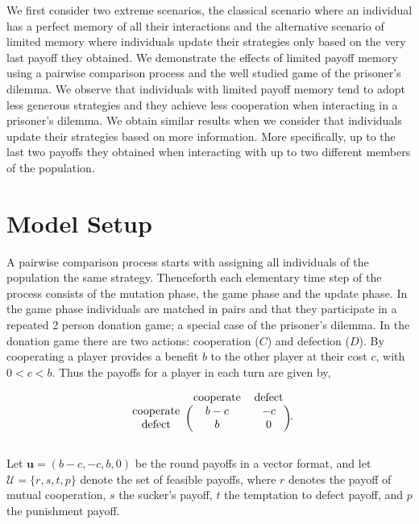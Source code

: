 \documentclass[11pt]{article}
\theoremstyle{plainCl1}
\theoremstyle{plainCl2}
\begin{document}
We first consider two extreme scenarios, the classical scenario where an individual
has a perfect memory of all their interactions and the alternative scenario of
limited memory where individuals update their strategies only based on the very
last payoff they obtained. We demonstrate the effects of limited payoff
memory using a pairwise comparison process and the well studied game of the
prisoner's dilemma. We observe that individuals with limited payoff memory tend to
adopt less generous strategies and they achieve less cooperation when
interacting in a prisoner's dilemma. We obtain similar results when we consider
that individuals update their strategies based on more information. More
specifically, up to the last two payoffs they obtained when interacting with up
to two different members of the population.

\section{Model Setup}\label{section:model}

A pairwise comparison process starts with assigning all
individuals of the population the same strategy. Thenceforth each elementary time step of
the process consists of the mutation phase, the game phase and the update phase.
In the game phase individuals are matched in pairs and that they participate in
a repeated 2 person donation game; a special case of the prisoner's dilemma. In
the donation game there are two actions: cooperation (\(C\)) and defection
(\(D\)). By cooperating a player provides a benefit \(b\) to the other player at
their cost \(c\), with \(0 < c < b\). Thus the payoffs for a player in each turn
are given by,

\begin{equation}
    \begin{blockarray}{ccc}
        & \text{cooperate} & \text{defect} \\
        \begin{block}{c(cc)}
            \text{cooperate} & b - c & -c \\
            \text{defect} & b & 0 \\
        \end{block}
    \end{blockarray}.
\end{equation}

Let \(\mathbf{u} = (b-c, -c, b, 0)\) be the round payoffs in a vector format, and let
\(\mathcal{U} = \{r, s, t, p\}\) denote the set of feasible payoffs, where \(r\)
denotes the payoff of mutual cooperation, \(s\) the sucker's payoff, \(t\) the
temptation to defect payoff, and \(p\) the punishment payoff.
\end{document}
